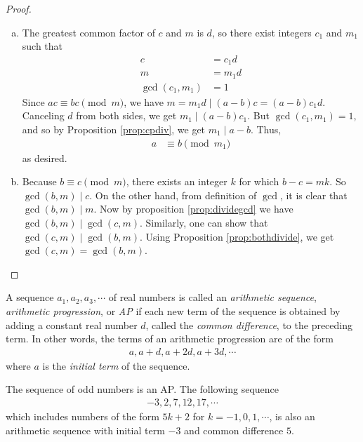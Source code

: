 \begin{proof}
	$ $
	\begin{enumerate}[(a)]
		\item The greatest common factor of $c$ and $m$ is $d$, so  there exist integers $c_1$ and $m_1$ such that
			\begin{align*}
			 	c
			 		& =c_1d\\
			 	m
			 		& = m_1 d\\
			 	\gcd(c_1,m_1)
			 		& = 1
			\end{align*}
		Since $ac \equiv bc \pmod m$, we have $m=m_1d\mid (a-b)c=(a-b)c_1d$. Canceling $d$ from both sides, we get $m_1\mid (a-b)c_1$. But $\gcd(c_1,m_1)=1$, and so by Proposition \ref{prop:cpdiv}, we get $m_1\mid a-b$. Thus,
			\begin{align*}
				a
					& \equiv b \pmod{m_1}
			\end{align*}
		as desired.

		\item Because $b \equiv c \pmod m$, there exists an integer $k$ for which $b-c=mk$. So $\gcd(b,m)\mid c$. On the other hand, from definition of $\gcd$, it is clear that $\gcd(b,m)\mid m$. Now by proposition \ref{prop:dividegcd} we have $\gcd(b,m)\mid \gcd(c,m)$. Similarly, one can show that $\gcd(c,m)\mid \gcd(b,m)$. Using Proposition \ref{prop:bothdivide}, we get $\gcd(c,m)=\gcd(b,m)$.
	\end{enumerate}
\end{proof}

\begin{definition}\label{def:AP}
	A sequence $a_1, a_2, a_3, \cdots$ of real numbers is called an \textit{arithmetic sequence}, \textit{arithmetic progression}, or \textit{AP} if each new term of the sequence is obtained by adding a constant real number $d$, called the \textit{common difference}, to the preceding term. In other words, the terms of an arithmetic progression are of the form
		\begin{align*}
			a, a+d, a+2d, a+3d, \cdots
		\end{align*}
	where $a$ is the \textit{initial term} of the sequence.
\end{definition}

\begin{example}
	The sequence of odd numbers is an AP. The following sequence
		\begin{align*}
			-3, 2, 7, 12, 17, \cdots
		\end{align*}
	which includes numbers of the form $5k+2$ for $k=-1,0,1,\cdots$, is also an arithmetic sequence with initial term $-3$ and common difference $5$.
\end{example}


